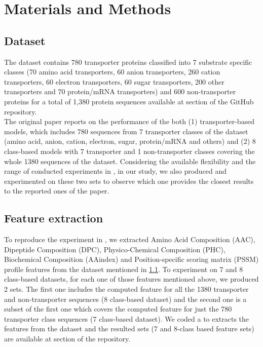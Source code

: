 \section{Materials and Methods}
\label{sec:materials}

    \subsection{Dataset}
    \label{sec:dataset}

    The dataset contains 780 transporter proteins classified into 7 substrate specific classes (70 amino acid transporters, 
    60 anion transporters, 260 cation transporters, 60 electron transporters,  60 sugar transporters, 
    200 other transporters and 70 protein/mRNA transporters) and 600 non-transporter proteins for a total of 1,380 protein 
    sequences available at  section of the GitHub repository.\\

    The original paper \cite{mishra2014prediction} reports on the performance of the both (1) transporter-based models, 
    which includes 780 sequences from 7 transporter classes of the dataset (amino acid, anion, cation, electron, sugar, protein/mRNA and others)
    and (2) 8 class-based models with 7 transporter and 1 non-transporter classes 
    covering the whole 1380 sequences of the dataset. Considering the available flexibility and 
    the range of conducted experiments in \cite{mishra2014prediction}, in our study, we also produced and 
    experimented on these two sets to observe which one provides the closest results to the reported ones of the paper.

    \subsection{Feature extraction}

    To reproduce the experiment in \cite{mishra2014prediction}, we extracted Amino Acid Composition (AAC), Dipeptide Composition (DPC), 
    Physico-Chemical Composition (PHC), Biochemical Composition (AAindex) and Position-specific scoring matrix (PSSM) profile 
    features from the dataset mentioned in \ref{sec:dataset}. To experiment on 7 and 8 class-based datasets,
    for each one of those features mentioned above, we produced 2 sets. The first one includes the computed feature for all 
    the 1380 transporter and non-transporter sequences (8 class-based dataset) and the second one is a subset of the 
    first one which covers the computed feature for just the 780 transporter class sequences (7 class-based dataset).
    We coded a  to extracts the features from the dataset and the resulted sets 
    (7 and 8-class based feature sets) are available at  section of the repository.


